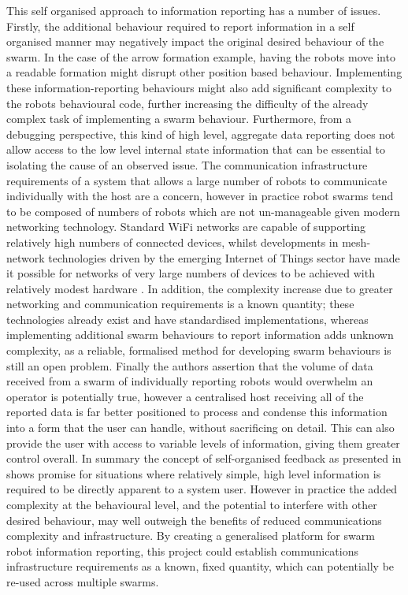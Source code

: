 This self organised approach to information reporting \cite{Podevijn:2012} has a number of issues. Firstly, the additional behaviour required to report information in a self organised manner may negatively impact the original desired behaviour of the swarm. In the case of the arrow formation example, having the robots move into a readable formation might disrupt other position based behaviour. Implementing these information-reporting behaviours might also add significant complexity to the robots behavioural code, further increasing the difficulty of the already complex task of implementing a swarm behaviour. Furthermore, from a debugging perspective, this kind of high level, aggregate data reporting does not allow access to the low level internal state information that can be essential to isolating the cause of an observed issue. The communication infrastructure requirements of a system that allows a large number of robots to communicate individually with the host are a concern, however in practice robot swarms tend to be composed of numbers of robots which are not un-manageable given modern networking technology. Standard WiFi networks are capable of supporting relatively high numbers of connected devices, whilst developments in mesh-network technologies driven by the emerging Internet of Things sector have made it possible for networks of very large numbers of devices to be achieved with relatively modest hardware \cite{Nguyen:2012}. In addition, the complexity increase due to greater networking and communication requirements is a known quantity; these technologies already exist and have standardised implementations, whereas implementing additional swarm behaviours to report information adds unknown complexity, as a reliable, formalised method for developing swarm behaviours is still an open problem. Finally the authors assertion that the volume of data received from a swarm of individually reporting robots would overwhelm an operator is potentially true, however a centralised host receiving all of the reported data is far better positioned to process and condense this information into a form that the user can handle, without sacrificing on detail. This can also provide the user with access to variable levels of information, giving them greater control overall. In summary the concept of self-organised feedback as presented in \cite{Podevijn:2012} shows promise for situations where relatively simple, high level information is required to be directly apparent to a system user. However in practice the added complexity at the behavioural level, and the potential to interfere with other desired behaviour, may well outweigh the benefits of reduced communications complexity and infrastructure. By creating a generalised platform for swarm robot information reporting, this project could establish communications infrastructure requirements as a known, fixed quantity, which can potentially be re-used across multiple swarms.

